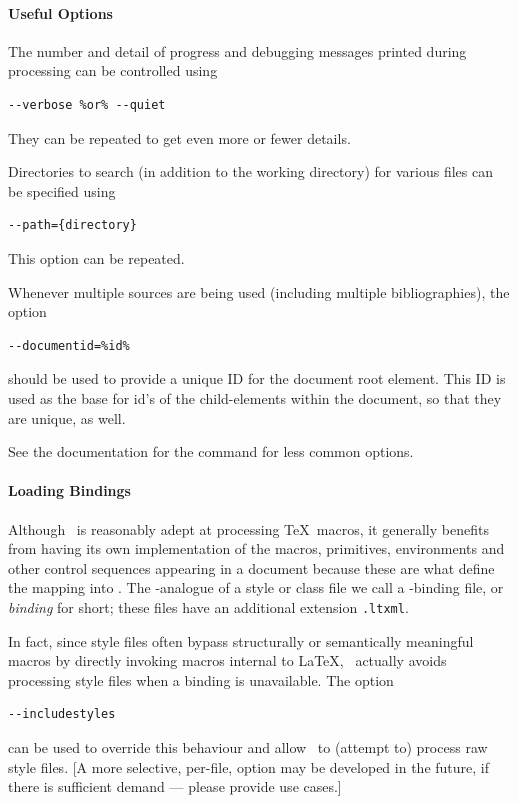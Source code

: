 \documentclass{book}
\begin{document}
\paragraph{Useful Options}\label{usage.conversion.options}
The number and detail of progress and debugging messages printed
during processing can be controlled using
\begin{lstlisting}[style=shell]
--verbose %or% --quiet
\end{lstlisting}
They can  be repeated to get even more or fewer details.

Directories to search (in addition to the working directory)
for various files can be specified using
\begin{lstlisting}[style=shell]
--path={directory}
\end{lstlisting}
This option can be repeated.

Whenever multiple sources are being used (including multiple bibliographies),
the option
\begin{lstlisting}[style=shell]
--documentid=%id%
\end{lstlisting}
should be used to provide a unique ID for the document root element.
This ID is used as the base for id's of the child-elements within the document,
so that they are unique, as well.

See the documentation for the command  for
less common options.

\paragraph{Loading Bindings}\label{usage.conversion.loading}
Although \LaTeXML\ is reasonably adept at processing \TeX\ macros,
it generally benefits from having its own implementation of
the macros, primitives, environments and other control sequences
appearing in a document because these are what define the mapping into \XML.
The \LaTeXML-analogue of a style or class file we call a
\LaTeXML-binding file, or \emph{binding} for short;
these files have an additional extension \texttt{.ltxml}.

In fact, since style files often bypass structurally or semantically
meaningful macros by directly invoking macros internal to \LaTeX,
\LaTeXML\ actually avoids processing style files when a binding is unavailable.
The option
\begin{lstlisting}[style=shell]
--includestyles
\end{lstlisting}
can be used to override this behaviour and allow \LaTeXML\ to
(attempt to) process raw style files.
[A more selective, per-file, option may be developed in the future,
if there is sufficient demand --- please provide use cases.]
\end{document}
